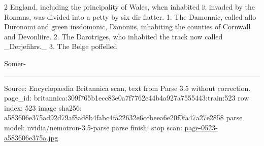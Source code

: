 \documentclass[10pt]{article}
\begin{document}
\begin{multicols}{2}
England, including the principality of Wales, when inhabited it invaded by the Romans, was divided into a petty by six dir flatter. 1. The Damonnic, called allo Duronomi and green insdomonic, Danoniis, inhabiting the counties of Cornwall and Devonliire. 2. The Darotriges, who inhabited the track now called \_Derjefihrs.\_ 3. The Belge poffelled

Somer-

\end{multicols}
\vfill\par\noindent\rule{\linewidth}{0.4pt}\par
{\scriptsize\color{gray}\noindent Source: Encyclopaedia Britannica scan, text from Parse 3.5 without correction. page\_id: britannica:309f765b1ecc83e0a7f7762e44b4a927a7555443:train:523 \quad row index: 523 \quad image sha256: a583606e375ad92d79af8ad8b4fabc4fa22632e6ccbeea6e20f0fa47a27e2858 \quad parse model: nvidia/nemotron-3.5-parse \quad parse finish: stop \quad scan: \href{../scans/page-0523-a583606e375a.jpg}{page-0523-a583606e375a.jpg}\par}
\end{document}
